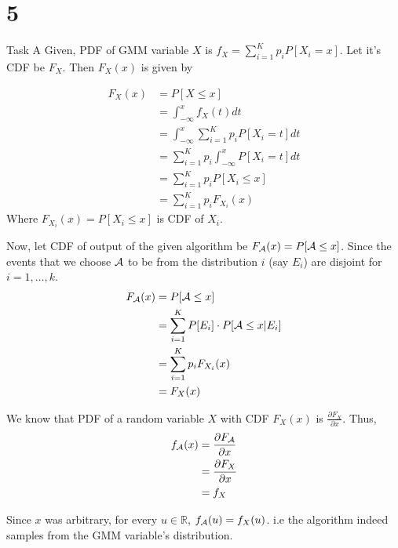 \chapter{5}
\begin{task}{Task A}
	Given, PDF of GMM variable $X$ is $f_X = \sum_{i=1}^K p_iP[X_i=x]$. Let
	it's CDF be $F_X$. Then $F_X(x)$ is given by

	\begin{align}
		F_X(x) & = P[X\leq x]                                    \\
		       & = \int_{-\infty}^{x} f_X(t)dt                   \\
		       & = \int_{-\infty}^{x} \sum_{i=1}^K p_iP[X_i=t]dt \\
		       & = \sum_{i=1}^K p_i\int_{-\infty}^{x} P[X_i=t]dt \\
		       & = \sum_{i=1}^K p_iP[X_i\leq x]                  \\
		       & = \sum_{i=1}^K p_iF_{X_i}(x)
	\end{align}
	Where $F_{X_i}(x) = P[X_i\leq x]$ is CDF of $X_i$.

	Now, let CDF of output of the given algorithm be
	$F_{\mathcal{A}}(x) = P[\mathcal{A}\leq x]$. Since the events that we choose $\mathcal{A}$ to be
	from the distribution $i$ (say $E_i$) are disjoint for $i=1,\dots,k$.
	\begin{align}
		F_{\mathcal{A}}(x) & = P[\mathcal{A}\leq x]                                \\
		        & = \sum_{i=1}^K P[E_i]\cdot P[\mathcal{A}\leq x | E_i] \\
		        & = \sum_{i=1}^K p_iF_{X_i}(x)                 \\
		        & = F_X(x)
	\end{align}

	We know that PDF of a random variable $X$ with CDF $F_X(x)$ is
	$\frac{\partial F_X}{\partial x}$. Thus,
	\begin{align}
		f_{\mathcal{A}}(x) & = \frac{\partial F_{\mathcal{A}}}{\partial x} \\
		        & = \frac{\partial F_X}{\partial x}  \\
		        & = f_X
	\end{align}

	Since $x$ was arbitrary, for every $u\in\mathbb{R}$, $f_{\mathcal{A}}(u) =
		f_X(u)$. i.e the algorithm indeed samples from the GMM variable's
	distribution.
\end{task}



